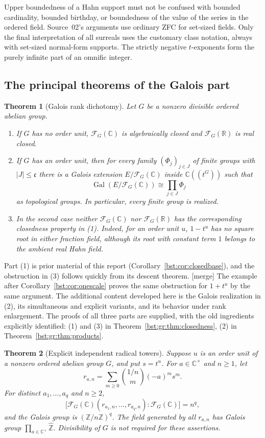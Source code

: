 \documentclass[11pt,letterpaper]{article}
\newtheorem{theorem}{Theorem}[section]
\theoremstyle{definition}
\theoremstyle{remark}
\newcommand{\R}{\mathbb R}
\newcommand{\C}{\mathbb C}
\newcommand{\Z}{\mathbb Z}
\newcommand{\HH}[2]{#1((t^{#2}))}
\newcommand{\FF}[2]{\mathcal F_{#2}(#1)}
\newcommand{\cc}{\mathfrak c}
\newcommand{\abs}[1]{\lvert #1\rvert}
\newcommand{\Gal}{\operatorname{Gal}}
\newcommand{\Zh}{\widehat{\Z}}
\begin{document}
Upper boundedness of a Hahn support must not be confused with bounded
cardinality, bounded birthday, or boundedness of the value of the series
in the ordered field. Source~02's arguments use ordinary ZFC for set-sized
fields. Only the final interpretation of all surreals uses the customary
class notation, always with set-sized normal-form supports. The strictly
negative $t$-exponents form the purely infinite part of an omnific integer.

\subsection{The principal theorems of the Galois part}\label{bst:gr:subsec:main}

\begin{theorem}[Galois rank dichotomy]\label{bst:gr:thm:main}
Let $G$ be a nonzero divisible ordered abelian group.
\begin{enumerate}
\item If $G$ has no order unit, $\FF{\C}G$ is algebraically
closed and $\FF{\R}G$ is real closed.
\item If $G$ has an order unit, then for every family $(\Phi_j)_{j\in J}$
of finite groups with $\abs{J}\leq\cc$ there is a Galois extension
$E/\FF{\C}G$ inside $\HH{\C}G$ such that
\[
 \Gal(E/\FF{\C}G)\cong\prod_{j\in J}\Phi_j
\]
as topological groups. In particular, every finite group is realized.
\item In the second case neither $\FF{\C}G$ nor $\FF{\R}G$ has the
corresponding closedness property in \textup{(1)}. Indeed, for an order unit
$u$, $1-t^u$ has no square root in either fraction field, although its root
with constant term $1$ belongs to the ambient real Hahn field.
\end{enumerate}
\end{theorem}

Part (1) is prior material of this report (Corollary~\ref{bst:cor:closedbase}),
and the obstruction in (3) follows quickly from its descent theorem.
\textup{[merge]} The example after Corollary~\ref{bst:cor:onescale} proves the
same obstruction for $1+t^u$ by the same argument.
The additional content developed here is the Galois realization in (2), its
simultaneous and explicit variants, and its behavior under rank
enlargement. The proofs of all three parts are supplied, with the old
ingredients explicitly identified: (1) and (3) in
Theorem~\ref{bst:gr:thm:closedness}, (2) in Theorem~\ref{bst:gr:thm:products}.

\begin{theorem}[Explicit independent radical towers]\label{bst:gr:thm:mainrad}
Suppose $u$ is an order unit of a nonzero ordered abelian group $G$,
and put $s=t^u$. For $a\in\C^\times$ and $n\geq1$, let
\[
 r_{a,n}=\sum_{m\geq0}\binom{1/n}{m}(-a)^m s^m.
\]
For distinct $a_1,\ldots,a_q$ and $n\geq2$,
\[
 \big[\FF{\C}G(r_{a_1,n},\ldots,r_{a_q,n}):\FF{\C}G\big]=n^q,
\]
and the Galois group is $(\Z/n\Z)^q$. The field generated by all
$r_{a,n}$ has Galois group $\prod_{a\in\C^\times}\Zh$.
Divisibility of $G$ is not required for these assertions.
\end{theorem}
\end{document}
